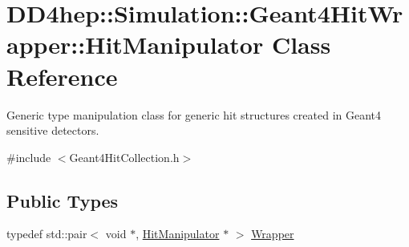 \hypertarget{class_d_d4hep_1_1_simulation_1_1_geant4_hit_wrapper_1_1_hit_manipulator}{}\section{D\+D4hep\+:\+:Simulation\+:\+:Geant4\+Hit\+Wrapper\+:\+:Hit\+Manipulator Class Reference}
\label{class_d_d4hep_1_1_simulation_1_1_geant4_hit_wrapper_1_1_hit_manipulator}


Generic type manipulation class for generic hit structures created in Geant4 sensitive detectors.  




{\ttfamily \#include $<$Geant4\+Hit\+Collection.\+h$>$}

\subsection*{Public Types}
\begin{DoxyCompactItemize}
\item 
typedef std\+::pair$<$ void $\ast$, \hyperlink{class_d_d4hep_1_1_simulation_1_1_geant4_hit_wrapper_1_1_hit_manipulator}{Hit\+Manipulator} $\ast$ $>$ \hyperlink{class_d_d4hep_1_1_simulation_1_1_geant4_hit_wrapper_1_1_hit_manipulator_a4bb62cc7e4979a8d0aea281477a4e38e}{Wrapper}
\end{DoxyCompactItemize}
